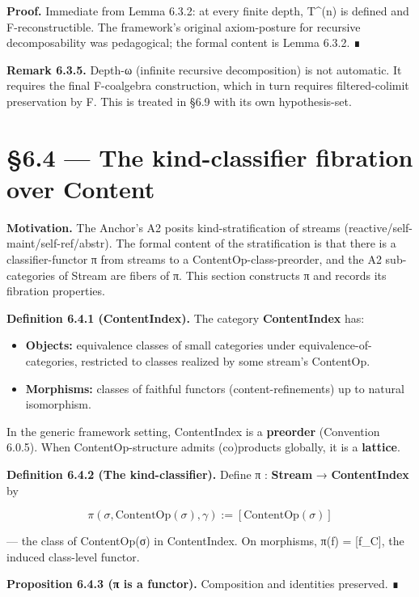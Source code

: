 \documentclass[11pt, openany]{book}
\newcommand{\sectionbreak}{\clearpage}
\begin{document}
\textbf{Proof.} Immediate from Lemma 6.3.2: at every finite depth, T\textasciicircum{}(n) is defined and F-reconstructible. The framework's original axiom-posture for recursive decomposability was pedagogical; the formal content is Lemma 6.3.2. ∎

\textbf{Remark 6.3.5.} Depth-ω (infinite recursive decomposition) is not automatic. It requires the final F-coalgebra construction, which in turn requires filtered-colimit preservation by F. This is treated in §6.9 with its own hypothesis-set.

\sectionbreak

\section{§6.4 --- The kind-classifier fibration over Content}

\textbf{Motivation.} The Anchor's A2 posits kind-stratification of streams (reactive/self-maint/self-ref/abstr). The formal content of the stratification is that there is a classifier-functor π from streams to a ContentOp-class-preorder, and the A2 sub-categories of Stream are fibers of π. This section constructs π and records its fibration properties.

\textbf{Definition 6.4.1 (ContentIndex).} The category \textbf{ContentIndex} has:

\begin{itemize}
\item \textbf{Objects:} equivalence classes of small categories under equivalence-of-categories, restricted to classes realized by some stream's ContentOp.
\item \textbf{Morphisms:} classes of faithful functors (content-refinements) up to natural isomorphism.
\end{itemize}

In the generic framework setting, ContentIndex is a \textbf{preorder} (Convention 6.0.5). When ContentOp-structure admits (co)products globally, it is a \textbf{lattice}.

\textbf{Definition 6.4.2 (The kind-classifier).} Define π : \textbf{Stream} → \textbf{ContentIndex} by

\[
\pi(\sigma, \mathrm{ContentOp}(\sigma), \gamma) := [\mathrm{ContentOp}(\sigma)]
\]

--- the class of ContentOp(σ) in ContentIndex. On morphisms, π(f) = [f\_\allowbreak{}C], the induced class-level functor.

\textbf{Proposition 6.4.3 (π is a functor).} Composition and identities preserved. ∎
\end{document}
